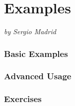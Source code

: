 \documentclass[a4paper,oneside,8pt]{extarticle}
\newcommand{\authoredpart}[2]{
  \clearpage
  \part{#1}
  \vspace{-1em} %
  \Large{\textit{by #2}}
  \vspace{2em} %
}
\theoremstyle{definition}
\begin{document}
\authoredpart{Examples}{Sergio Madrid}

\section{Basic Examples}

\section{Advanced Usage}

\section{Exercises}

\end{document}
